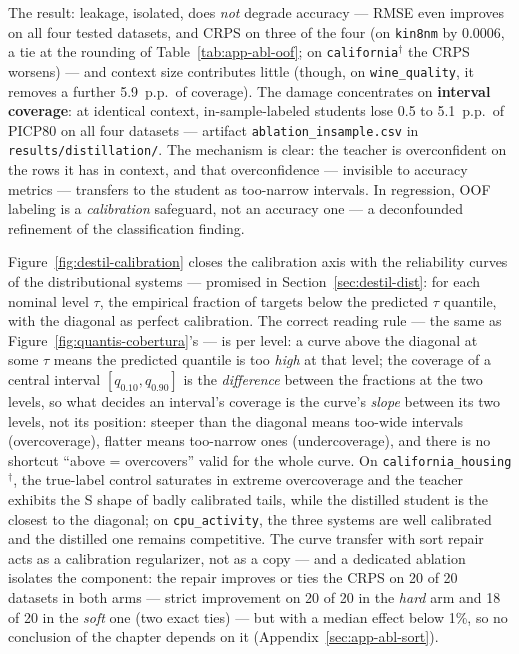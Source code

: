 The result: leakage, isolated, does \emph{not} degrade accuracy ---
RMSE even improves on all four tested datasets, and CRPS on three of
the four (on \texttt{kin8nm} by 0.0006, a tie at the rounding of
Table~\ref{tab:app-abl-oof}; on \texttt{california}$^\dagger$ the
CRPS worsens)
--- and context size contributes little (though, on
\texttt{wine\_quality}, it removes a further 5.9~p.p.\ of coverage).
The damage concentrates on \textbf{interval coverage}: at identical
context, in-sample-labeled students lose 0.5 to 5.1~p.p.\ of PICP80
on all four datasets --- artifact
\texttt{ablation\_\allowbreak insample.\allowbreak csv} in
\texttt{results/\allowbreak distillation/}. The mechanism is
clear: the teacher is overconfident on the rows it has in context,
and that overconfidence --- invisible to accuracy metrics ---
transfers to the student as too-narrow intervals. In regression, OOF
labeling is a \emph{calibration} safeguard, not an accuracy one ---
a deconfounded refinement of the classification finding.

Figure~\ref{fig:destil-calibration} closes the calibration axis with
the reliability curves of the distributional systems --- promised in
Section~\ref{sec:destil-dist}: for each nominal level $\tau$, the
empirical fraction of targets below the predicted $\tau$ quantile,
with the diagonal as perfect calibration. The correct reading rule
--- the same as Figure~\ref{fig:quantis-cobertura}'s --- is per
level: a curve above the diagonal at some $\tau$ means the predicted
quantile is too \emph{high} at that level; the coverage of a central
interval $[q_{0.10}, q_{0.90}]$ is the \emph{difference} between the
fractions at the two levels, so what decides an interval's coverage
is the curve's \emph{slope} between its two levels, not its
position: steeper than the diagonal means too-wide intervals
(overcoverage), flatter means too-narrow ones (undercoverage), and
there is no shortcut ``above = overcovers'' valid for the whole
curve. On
\texttt{california\_\allowbreak housing}$^\dagger$, the true-label
control saturates in extreme overcoverage and the teacher exhibits
the S shape of badly calibrated tails, while the distilled student
is the closest to the diagonal; on \texttt{cpu\_activity}, the three
systems are well calibrated and the distilled one remains
competitive. The curve transfer with sort repair acts as a
calibration regularizer, not as a copy --- and a dedicated ablation
isolates the component: the repair improves or ties the CRPS on 20
of 20 datasets in both arms --- strict improvement on 20 of 20 in
the \emph{hard} arm and 18 of 20 in the \emph{soft} one (two exact
ties) --- but with a median effect below 1\%, so no conclusion of
the chapter depends on it (Appendix~\ref{sec:app-abl-sort}).


